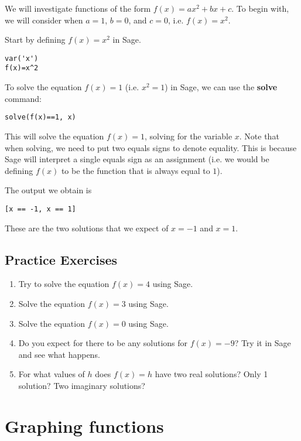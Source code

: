 We will investigate functions of the form $f(x)=ax^2+bx+c$. To begin
with, we will consider when $a=1$, $b=0$, and $c=0$, i.e. $f(x)=x^2$.

Start by defining $f(x)=x^2$ in Sage.

\begin{verbatim}
var('x')
f(x)=x^2
\end{verbatim}

To solve the equation $f(x)=1$ (i.e. $x^2=1$) in Sage, we can use the
\textbf{solve} command:

\begin{verbatim}
solve(f(x)==1, x)
\end{verbatim}

This will solve the equation $f(x)=1$, solving for the variable $x$.
Note that when solving, we need to put two equals signs to denote
equality. This is because Sage will interpret a single equals sign
as an assignment (i.e. we would be defining $f(x)$ to be the function
that is always equal to $1$).

The output we obtain is

\begin{verbatim}
[x == -1, x == 1]
\end{verbatim}

These are the two solutions that we expect of $x=-1$ and $x=1$.

\subsection{Practice Exercises}

\begin{enumerate}
	\item Try to solve the equation $f(x)=4$ using Sage.
	\item Solve the equation $f(x)=3$ using Sage.
	\item Solve the equation $f(x)=0$ using Sage.
	\item Do you expect for there to be any solutions for $f(x)=-9$?
		Try it in Sage and see what happens.
	\item For what values of $h$ does $f(x)=h$ have two real solutions?
		Only 1 solution? Two imaginary solutions?
\end{enumerate}

\section{Graphing functions}

